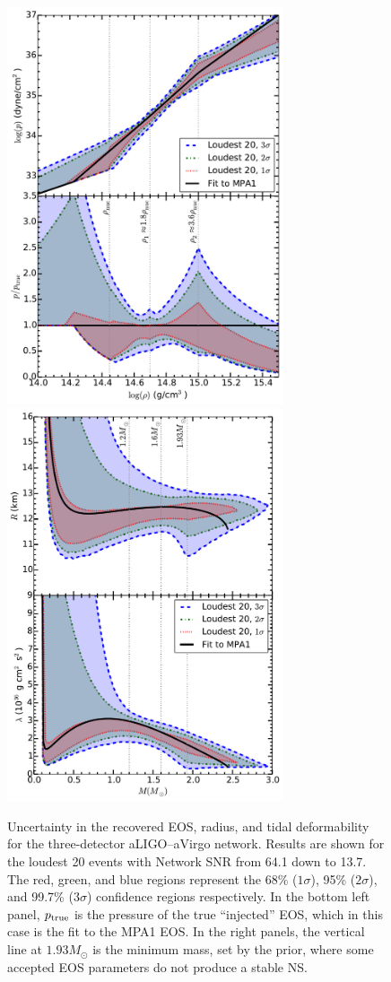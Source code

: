 \documentclass[twocolumn,prd,amssymb,aps,nofootinbib,showpacs,epsf]{revtex4}
\begin{document}
\begin{figure}[!htb]
\begin{center}
\includegraphics[width=3.2in]{LALMCMCmpa1FitTaylorF2ZeroNoiseBNS20p.pdf}
\includegraphics[width=3.2in]{LALMCMCmpa1FitTaylorF2ZeroNoiseBNS20Radiuslambda.pdf}
\caption{Uncertainty in the recovered EOS, radius, and tidal deformability for the three-detector aLIGO--aVirgo network. Results are shown for the loudest 20 events with Network SNR from 64.1 down to 13.7. The red, green, and blue regions represent the 68\% ($1\sigma$), 95\% ($2\sigma$), and 99.7\% ($3\sigma$) confidence regions respectively. In the bottom left panel, $p_{\rm true}$ is the pressure of the true ``injected'' EOS, which in this case is the fit to the MPA1 EOS. In the right panels, the vertical line at $1.93M_\odot$ is the minimum mass, set by the prior, where some accepted EOS parameters do not produce a stable NS.}
\label{fig:mpa1fit}
\end{center}
\end{figure}
\end{document}
